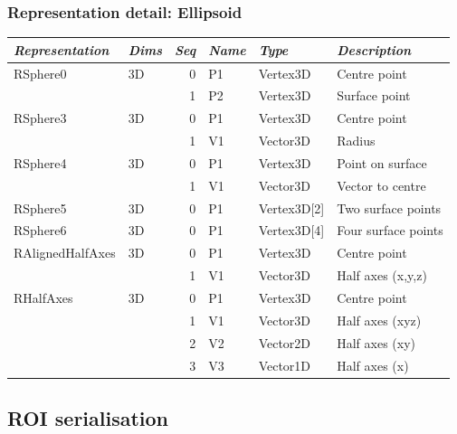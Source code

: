 \documentclass{beamer}
\begin{document}
\begin{frame}[fragile]
  \frametitle{Representation detail: Ellipsoid}
\scriptsize
\begin{tabular}{llrlll}
\textit{Representation} &  \textit{Dims} & \textit{Seq} & \textit{Name}  & \textit{Type}         & \textit{Description} \\
\toprule
RSphere0          & 3D   & 0   & P1  & Vertex3D     & Centre point \\
                  &      & 1   & P2  & Vertex3D     & Surface point \\
\cmidrule{3-6}
RSphere3          & 3D   & 0   & P1  & Vertex3D     & Centre point \\
                  &      & 1   & V1  & Vector3D     & Radius \\
\cmidrule{3-6}
RSphere4          & 3D   & 0   & P1  & Vertex3D     & Point on surface \\
                  &      & 1   & V1  & Vector3D     & Vector to centre \\
\cmidrule{3-6}
RSphere5          & 3D   & 0   & P1  & Vertex3D[2]  & Two surface points \\
\cmidrule{3-6}
RSphere6          & 3D   & 0   & P1  & Vertex3D[4]  & Four surface points \\
\cmidrule{3-6}
RAlignedHalfAxes  & 3D   & 0   & P1  & Vertex3D     & Centre point \\
                  &      & 1   & V1  & Vector3D     & Half axes (x,y,z) \\
\cmidrule{3-6}
RHalfAxes         & 3D   & 0   & P1  & Vertex3D     & Centre point \\
                  &      & 1   & V1  & Vector3D     & Half axes (xyz) \\
                  &      & 2   & V2  & Vector2D     & Half axes (xy) \\
                  &      & 3   & V3  & Vector1D     & Half axes (x) \\
\end{tabular}
\end{frame}

\subsection{ROI serialisation}

\end{document}

